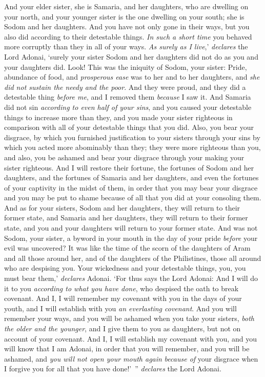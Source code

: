 \begin{biblechapter}
\verse And your elder sister, she is Samaria, and her daughters, who are dwelling on your north, and your younger sister is the one dwelling on your south; she is Sodom and her daughters.
\verse And you have not only gone in their ways, but you also did according to their detestable things. \textit{In such a short time} you behaved more corruptly than they in all of your ways.
\verse \textit{As surely as I live},’ \textit{declares} the Lord Adonai, ‘surely your sister Sodom and her daughters did not do as you and your daughters did.
\verse Look! This was the iniquity of Sodom, your sister: Pride, abundance of food, and \textit{prosperous ease} was to her and to her daughters, and \textit{she did not sustain the needy and the poor}.
\verse And they were proud, and they did a detestable thing \textit{before me}, and I removed them \textit{because} I saw it.
\verse And Samaria did not sin \textit{according to even half of your sins}, and you caused your detestable things to increase more than they, and you made your sister righteous in comparison with all of your detestable things that you did.
\verse Also, you bear your disgrace, by which you furnished justification to your sisters through your sins by which you acted more abominably than they; they were more righteous than you, and also, you be ashamed and bear your disgrace through your making your sister righteous.
\verse And I will restore their fortune, the fortunes of Sodom and her daughters, and the fortunes of Samaria and her daughters, and even the fortunes of your captivity in the midst of them,
\verse in order that you may bear your disgrace and you may be put to shame because of all that you did at your consoling them.
\verse And as for your sisters, Sodom and her daughters, they will return to their former state, and Samaria and her daughters, they will return to their former state, and you and your daughters will return to your former state.
\verse And was not Sodom, your sister, a byword in your mouth in the day of your pride
\verse \textit{before} your evil was uncovered? It was like the time of the scorn of the daughters of Aram and all those around her, and of the daughters of the Philistines, those all around who are despising you.
\verse Your wickedness and your detestable things, you, you must bear them,’ \textit{declares} Adonai.
\verse ‘For thus says the Lord Adonai: And I will do it to you \textit{according to what you have done}, who despised the oath to break covenant.
\verse And I, I will remember my covenant with you in the days of your youth, and I will establish with you \textit{an everlasting covenant}.
\verse And you will remember your ways, and you will be ashamed when you take your sisters, \textit{both the older and the younger}, and I give them to you as daughters, but not on account of your covenant.
\verse And I, I will establish my covenant with you, and you will know that I am Adonai,
\verse in order that you will remember, and you will be ashamed, and \textit{you will not open your mouth again} \textit{because of} your disgrace when I forgive you for all that you have done!’ ” \textit{declares} the Lord Adonai.
\end{biblechapter}

